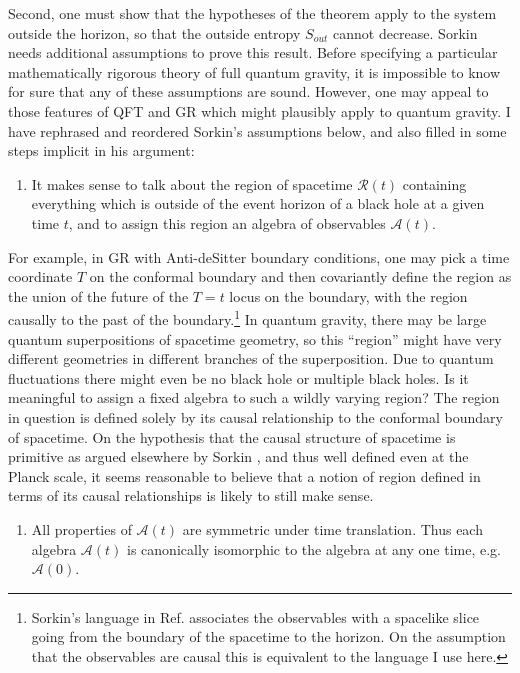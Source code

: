 \documentclass[12pt]{article}
\begin{document}
Second, one must show that the hypotheses of the theorem apply to the system outside the horizon, so that the outside entropy $S_{out}$ cannot decrease.  Sorkin needs additional assumptions to prove this result.  Before specifying a particular mathematically rigorous theory of full quantum gravity, it is impossible to know for sure that any of these assumptions are sound.  However, one may appeal to those features of QFT and GR which might plausibly apply to quantum gravity.  I have rephrased and reordered Sorkin's assumptions below, and also filled in some steps implicit in his argument:

\setcounter{comment}{0}

\begin{enumerate}

\item It makes sense to talk about the region of spacetime $\mathcal{R}(t)$ containing everything which is outside of the event horizon of a black hole at a given time $t$, and to assign this region an algebra of observables $\mathcal{A}(t)$.

\setcounter{comment}{\value{enumi}}
\end{enumerate}
\noindent
For example, in GR with Anti-deSitter boundary conditions, one may pick a time coordinate $T$ on the conformal boundary and then covariantly define the region as the union of the future of the $T=t$ locus on the boundary, with the region causally to the past of the boundary.\footnote{Sorkin's language in Ref. \cite{sorkin86} associates the observables with a spacelike slice going from the boundary of the spacetime to the horizon.  On the assumption that the observables are causal this is equivalent to the language I use here.}  In quantum gravity, there may be large quantum superpositions of spacetime geometry, so this ``region'' might have very different geometries in different branches of the superposition.  Due to quantum fluctuations there might even be no black hole or multiple black holes. Is it meaningful to assign a fixed algebra to such a wildly varying region?  The region in question is defined solely by its causal relationship to the conformal boundary of spacetime.  On the hypothesis that the causal structure of spacetime is primitive as argued elsewhere by Sorkin \cite{sorkin97}, and thus well defined even at the Planck scale, it seems reasonable to believe that a notion of region defined in terms of its causal relationships is likely to still make sense.
\begin{enumerate}
\setcounter{enumi}{\value{comment}}

\item All properties of $\mathcal{A}(t)$ are symmetric under time translation.  Thus each algebra $\mathcal{A}(t)$ is canonically isomorphic to the algebra at any one time, e.g.
$\mathcal{A}(0)$.

\setcounter{comment}{\value{enumi}}
\end{enumerate}
\end{document}
